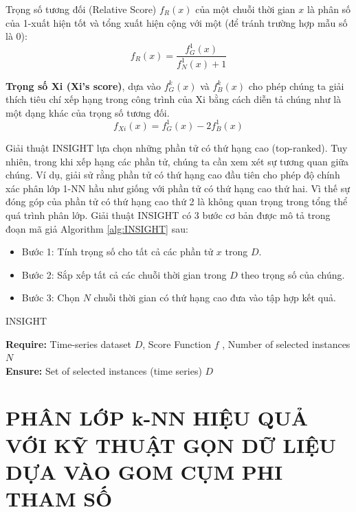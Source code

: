 \documentclass[13pt,oneside]{scrbook}
\begin{document}
Trọng số tương đối (Relative Score) $f_R(x)$ của một chuỗi thời gian $x$ là phân số của 1-xuất hiện tốt và tổng xuất hiện cộng với một (để tránh trường hợp mẫu số là 0):
 \begin{equation}
f_R(x) = \frac{f^1_G(x)}{f^1_N(x)+1}
\end{equation}

\textbf{Trọng số Xi (Xi's score)}, dựa vào $f^k_G(x)$ và $f^k_B(x)$ cho phép chúng ta giải thích tiêu chí xếp hạng trong công trình của Xi bằng cách diễn tả chúng như là một dạng khác của trọng số tương đối.
\begin{equation}
f_{Xi}(x) = f^1_G(x) - 2f^1_B(x)
\end{equation}

Giải thuật INSIGHT lựa chọn những phần tử có thứ hạng cao (top-ranked). Tuy nhiên, trong khi xếp hạng các phần tử, chúng ta cần xem xét sự tương quan giữa chúng. Ví dụ, giải sử rằng phần tử có thứ hạng cao đầu tiên cho phép độ chính xác phân lớp 1-NN hầu như giống với phần tử có thứ hạng cao thứ hai. Vì thế sự đóng góp của phần tử có thứ hạng cao thứ 2 là không quan trọng trong tổng thể quá trình phân lớp. 
Giải thuật INSIGHT có 3 bước cơ bản được mô tả trong đoạn mã giả Algorithm \ref{alg:INSIGHT} sau:
\begin{itemize}
	\item Bước 1: Tính trọng số cho tất cả các phần tử $x$ trong $D$.
	\item Bước 2: Sắp xếp tất cả các chuỗi thời gian trong $D$ theo trọng số của chúng.
	\item Bước 3: Chọn $N$ chuỗi thời gian có thứ hạng cao đưa vào tập hợp kết quả.\end{itemize}
\begin{algorithm}
  \caption{INSIGHT
   \label{alg:INSIGHT}}
    \textbf{Require:} Time-series dataset $D$, Score Function $f$ , Number of selected instances $N$\\
    \textbf{Ensure:} Set of selected instances (time series) $D$
  \begin{algorithmic}[1]
  \end{algorithmic}
\end{algorithm}

\section{PHÂN LỚP k-NN HIỆU QUẢ VỚI KỸ THUẬT GỌN DỮ LIỆU DỰA VÀO GOM CỤM PHI THAM SỐ}
\end{document}
